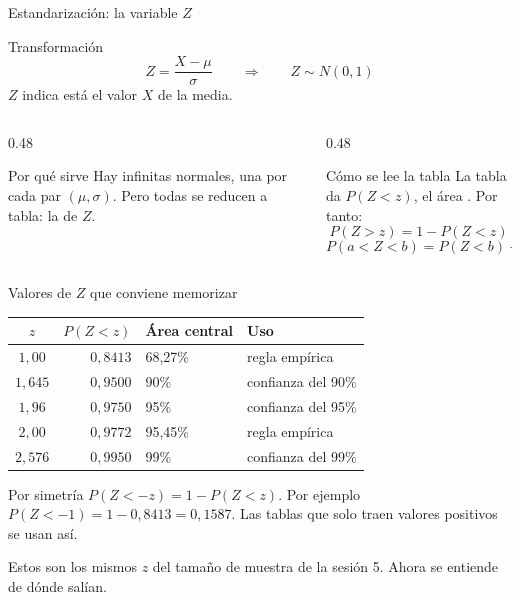 \documentclass[aspectratio=169,10pt]{beamer}
\begin{document}
\begin{frame}{Estandarización: la variable $Z$}
  \begin{block}{Transformación}
    \[ Z=\frac{X-\mu}{\sigma} \qquad\Longrightarrow\qquad Z\sim N(0,1) \]
    $Z$ indica  está el valor $X$ de
    la media.
  \end{block}

  \vspace{0.2cm}
  \begin{columns}[T,onlytextwidth]
    \begin{column}{0.48\textwidth}
      \begin{exampleblock}{Por qué sirve}
        \footnotesize
        Hay infinitas normales, una por cada par $(\mu,\sigma)$. Pero todas se
        reducen a  tabla: la de $Z$.
      \end{exampleblock}
    \end{column}
    \begin{column}{0.48\textwidth}
      \begin{alertblock}{Cómo se lee la tabla}
        \footnotesize
        La tabla da $P(Z<z)$, el área . Por tanto:
        \[ P(Z>z)=1-P(Z<z) \]
        \[ P(a<Z<b)=P(Z<b)-P(Z<a) \]
      \end{alertblock}
    \end{column}
  \end{columns}
\end{frame}

\begin{frame}{Valores de $Z$ que conviene memorizar}
  \footnotesize
  \begin{center}
  \begin{tabular}{@{}crll@{}}
    \toprule
    $z$ & $P(Z<z)$ & \textbf{Área central} & \textbf{Uso} \\
    \midrule
    $1{,}00$  & $0{,}8413$ & 68{,}27\% & regla empírica \\
    $1{,}645$ & $0{,}9500$ & 90\% & confianza del 90\% \\
    $1{,}96$  & $0{,}9750$ & 95\% & confianza del 95\% \\
    $2{,}00$  & $0{,}9772$ & 95{,}45\% & regla empírica \\
    $2{,}576$ & $0{,}9950$ & 99\% & confianza del 99\% \\
    \bottomrule
  \end{tabular}
  \end{center}

  \vspace{0.25cm}
  \begin{alertblock}{Por simetría}
    \footnotesize
    $P(Z<-z)=1-P(Z<z)$. Por ejemplo $P(Z<-1)=1-0{,}8413=0{,}1587$. Las tablas
    que solo traen valores positivos se usan así.
  \end{alertblock}

  \vspace{0.1cm}
  {\scriptsize\color{uniGris} Estos son los mismos $z$ del tamaño de muestra de
  la sesión 5. Ahora se entiende de dónde salían.}
\end{frame}
\end{document}
